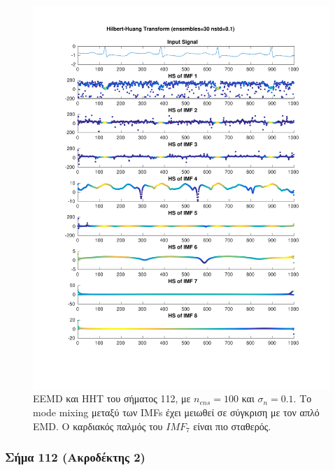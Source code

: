 \documentclass[11pt,a4paper]{article}
\begin{document}
\begin{figure}[H]
\begin{minipage}{0.48\textwidth}
	\includegraphics[width=\textwidth]{fig/112l1_hht_ensemble.pdf}
\end{minipage}
\vfill
\caption{EEMD και HHT του σήματος 112, με $n_{ens}=100$ και $\sigma_n = 0.1$. Το mode mixing μεταξύ των IMFs έχει μειωθεί σε σύγκριση με τον απλό EMD. Ο καρδιακός παλμός του $IMF_{7}$ είναι πιο σταθερός.}
\label{fig:112l1_hht_ensemble}
\end{figure}

\subsubsection*{Σήμα 112 (Ακροδέκτης 2)}
\end{document}
